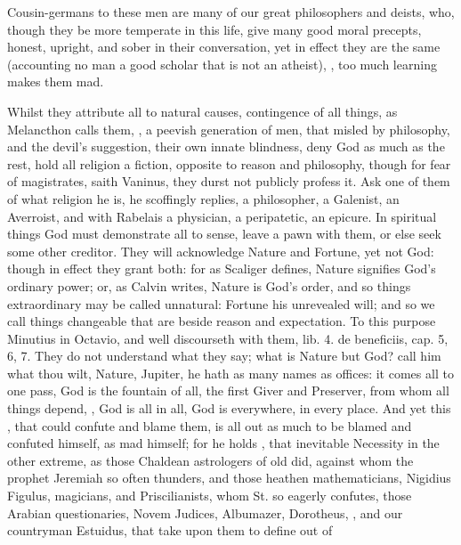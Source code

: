 {Cousin-germans to these men are many of our great philosophers and
deists, who, though they be more temperate in this life, give many good
moral precepts, honest, upright, and sober in their conversation, yet
in effect they are the same (accounting no man a good scholar that is
not an atheist), , too much learning makes them mad.

Whilst they attribute all to natural causes, contingence of all
things, as Melancthon calls them, , a peevish
generation of men, that misled by philosophy, and the devil's
suggestion, their own innate blindness, deny God as much as the rest,
hold all religion a fiction, opposite to reason and philosophy, though
for fear of magistrates, saith Vaninus, they durst not publicly
profess it. Ask one of them of what religion he is, he scoffingly
replies, a philosopher, a Galenist, an Averroist, and with
Rabelais a physician, a peripatetic, an epicure. In spiritual things
God must demonstrate all to sense, leave a pawn with them, or else seek
some other creditor. They will acknowledge Nature and Fortune, yet not
God: though in effect they grant both: for as Scaliger defines, Nature
signifies God's ordinary power; or, as Calvin writes, Nature is God's
order, and so things extraordinary may be called unnatural: Fortune his
unrevealed will; and so we call things changeable that are beside
reason and expectation. To this purpose Minutius in Octavio, and
 \Seneca well discourseth with them, lib. 4. de beneficiis, cap.
5, 6, 7. They do not understand what they say; what is Nature but God?
call him what thou wilt, Nature, Jupiter, he hath as many names as
offices: it comes all to one pass, God is the fountain of all, the
first Giver and Preserver, from whom all things depend, , God is
all in all, God is everywhere, in every place. And yet this \Seneca,
that could confute and blame them, is all out as much to be blamed and
confuted himself, as mad himself; for he holds , that
inevitable Necessity in the other extreme, as those Chaldean
astrologers of old did, against whom the prophet Jeremiah so often
thunders, and those heathen mathematicians, Nigidius Figulus,
magicians, and Priscilianists, whom St. \Austin{} so eagerly confutes,
those Arabian questionaries, Novem Judices, Albumazer, Dorotheus, \etc{},
and our countryman Estuidus, that take upon them to define out of
}
